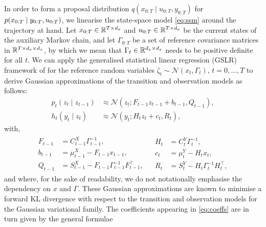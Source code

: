 In order to form a proposal distribution $q(x_{0:T} \mid u_{0:T}, y_{0:T})$ for $p(x_{0:T} \mid y_{0:T}, u_{0:T})$, we linearise the state-space model \eqref{eq:ssm} around the trajectory at hand.
Let $x_{0:T} \in \mathbb{R}^{T \times d_x}$ and $u_{0:T} \in \mathbb{R}^{T \times d_x}$ be the current states of the auxiliary Markov chain, and let $\Gamma_{0:T}$ be a set of reference covariance matrices in $\mathbb{R}^{T \times d_x \times d_x}$, by which we mean that $\Gamma_t \in \mathbb{R}^{d_x \times d_x}$ needs to be positive definite for all $t$. We can apply the generalised statistical linear regression (GSLR) framework of \citet{Tronarp2018iterative} for the reference random variables $\zeta_t \sim \mathcal{N}(x_t, \Gamma_t)$, $t=0, \ldots, T$ to derive Gaussian approximations of the transition and observation models as follows:
\begin{equation}
    \label{eq:general_approx}
    \begin{split}
        p_{t}(z_t \mid z_{t-1})
        &\approx \mathcal{N}(z_t ; F_{t-1} z_{t-1} + b_{t-1}, Q_{t-1}), \\
        h_{t}(y_t \mid z_{t})
        &\approx \mathcal{N}(y_t ; H_{t} z_{t} + c_{t}, R_{t}),
    \end{split}
\end{equation}
with,
\begin{align}
    \label{eq:coeffs}
    \begin{split}
        F_{t-1} &= C^X_{t-1} \Gamma_{t-1}^{-1},\\
        b_{t-1} &= \mu^X_{t-1} - F_{t-1} x_{t-1},\\
        Q_{t-1} &= S^X_{t-1} - F_{t-1} \Gamma_{t-1}^{-1} F_{t-1}^{\top},
    \end{split}
    &
    \begin{split}
        H_{t} &= C^Y_{t} \Gamma_{t}^{-1},\\
        c_{t} &= \mu^Y_{t} - H_{t} x_{t},\\
        R_{t} &= S^Y_{t} - H_{t} \Gamma_{t}^{-1} H_{t}^{\top},
    \end{split}
\end{align}
and where, for the sake of readability, we do not notationally emphasise the dependency on $x$ and $\Gamma$. These Gaussian approximations are known to minimise a forward KL divergence with respect to the transition and observation models for the Gaussian variational family. The coefficients appearing in \eqref{eq:coeffs} are in turn given by the general formulae
